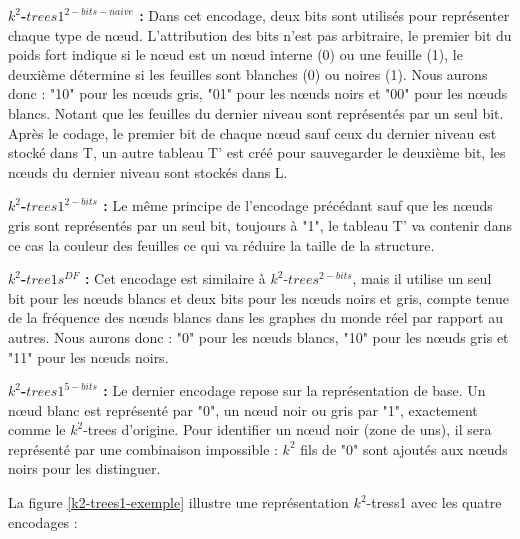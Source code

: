 \textbf{ $k^2$-$trees1^{2-bits-naive}$ :} Dans cet encodage, deux bits sont utilisés pour représenter chaque type de nœud. L'attribution des bits n'est pas arbitraire, le premier bit du poids fort indique si le nœud est un nœud interne (0) ou une feuille (1), le deuxième détermine si les feuilles sont blanches (0) ou noires (1). Nous aurons donc : "10" pour les nœuds gris, "01" pour les nœuds noirs et "00" pour les nœuds blancs. Notant que les feuilles du dernier niveau sont représentés par un seul bit.
Après le codage, le premier bit de chaque nœud sauf ceux du dernier niveau est stocké dans T, un autre tableau T' est créé pour sauvegarder le deuxième bit, les nœuds du dernier niveau sont stockés dans L.

\textbf{ $k^2$-$trees1^{2-bits}$ :} Le même principe de l'encodage précédant sauf que les nœuds gris sont représentés par un seul bit, toujours à "1", le tableau T' va contenir dans ce cas la couleur des feuilles ce qui va réduire la taille de la structure.

\textbf{ $k^2$-$tree1s^{DF}$ :} Cet encodage est similaire à $k^2$-$trees^{2-bits}$, mais il utilise un seul bit pour les nœuds blancs et deux bits pour les nœuds noirs et gris, compte tenue de la fréquence des nœuds blancs dans les graphes du monde réel par rapport au autres. Nous aurons donc : "0" pour les nœuds blancs, "10" pour les nœuds gris et "11" pour les nœuds noirs.

\textbf{ $k^2$-$trees1^{5-bits}$ :} Le dernier encodage repose sur la représentation de base. Un nœud blanc est représenté par "0", un nœud noir ou gris par "1", exactement comme le $k^2$-trees d'origine. Pour identifier un nœud noir (zone de uns), il sera représenté par une combinaison impossible : $k^2$ fils de "0" sont ajoutés aux nœuds noirs pour les distinguer.


La figure \ref{k2-trees1-exemple} illustre une représentation $k^2$-tress1 avec les quatre encodages \citep{de2014new} : 


